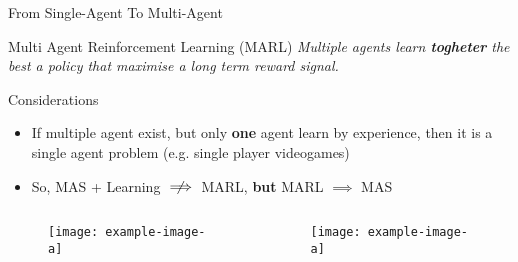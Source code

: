 \documentclass[presentation]{beamer}\mode<presentation>{\usetheme{AMSBolognaFC}}
\begin{document}
\begin{frame}[c]{From Single-Agent To Multi-Agent}
	\begin{alertblock}{Multi Agent Reinforcement Learning (MARL)}
		\centering
		\emph{Multiple agents learn \textbf{togheter} the best a policy that maximise
	a long term reward signal.}
	\end{alertblock}
	\begin{exampleblock}{Considerations}
		\begin{itemize}
			\item If multiple agent exist, but only \textbf{one} agent learn by experience, then it is a single agent problem (e.g. single player videogames)
			\item So, MAS + Learning $\centernot\implies$ MARL, \textbf{but} MARL $\implies$ MAS
		\end{itemize}
	\end{exampleblock}
	\begin{columns}
		\begin{column}{0.5\textwidth}		
			\begin{figure}
				\texttt{[image: example-image-a]}
			\end{figure}
		\end{column}
		\begin{column}{0.5\textwidth}	
			\begin{figure}
				\texttt{[image: example-image-a]}
			\end{figure}
		\end{column}
	\end{columns}
\end{frame}
\end{document}
